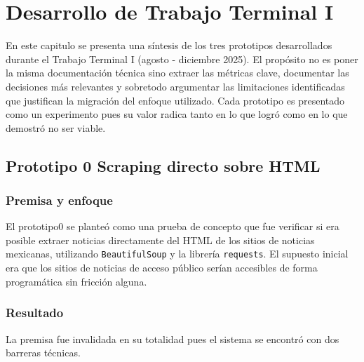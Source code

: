 

\chapter{Desarrollo de Trabajo Terminal I}
\label{cap:desarrollo_tt1}

En este capitulo se presenta una síntesis de los tres prototipos desarrollados durante
el Trabajo Terminal I (agosto - diciembre 2025). El propósito no es poner la misma
documentación técnica sino extraer las métricas clave, documentar las
decisiones más relevantes y sobretodo argumentar las limitaciones identificadas
que justifican la migración del enfoque utilizado. Cada prototipo es presentado como un
experimento pues su valor radica tanto en lo que logró como en lo que
demostró no ser viable. 


\section{Prototipo 0 Scraping directo sobre HTML}
\label{sec:p0_fracaso}


\subsection{Premisa y enfoque}
\label{subsec:p0_premisa}

El prototipo0 se planteó como una prueba de concepto que fue verificar si era posible
extraer noticias directamente del HTML de los sitios de noticias mexicanas, utilizando
\texttt{BeautifulSoup} y la librería \texttt{requests}. El supuesto inicial era
que los sitios de noticias de acceso público serían accesibles de forma programática
sin fricción alguna.

\subsection{Resultado}
\label{subsec:p0_resultado}

La premisa fue invalidada en su totalidad pues el sistema se encontró con dos barreras
técnicas.

